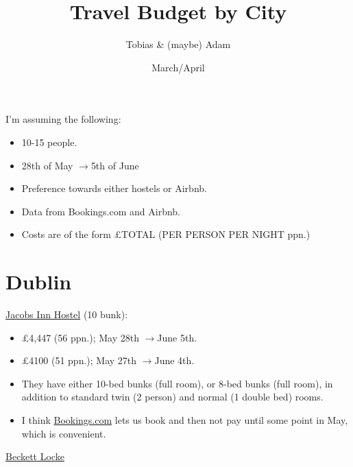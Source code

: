\documentclass[12pt]{article}
\title{Travel Budget by City}
\author{Tobias \& (maybe) Adam}
\date{March/April}
\renewcommand{\to}{$\rightarrow$}
\newcommand{\cost}[2]{\pounds#1 (#2 ppn.)}
\begin{document}
	\maketitle
	I'm assuming the following:
	\begin{itemize}
		\item 10-15 people.
		\item 28th of May \to 5th of June
		\item Preference towards either hostels or Airbnb.
		\item Data from Bookings.com and Airbnb.
		\item Costs are of the form \cost{TOTAL}{PER PERSON PER NIGHT }
	\end{itemize}
	
	\section{Dublin}
	\href{https://www.booking.com/hotel/ie/jacobs-inn.html?aid=355028;sid=3f62ec944d118827daff72c411262409;all_sr_blocks=4030233_332718678_0_2_0;checkin=2022-05-28;checkout=2022-06-05;dest_id=-1502554;dest_type=city;dist=0;group_adults=10;group_children=0;hapos=1;highlighted_blocks=4030233_332718678_0_2_0;hpos=1;matching_block_id=4030233_332718678_0_2_0;no_rooms=1;req_adults=10;req_children=0;room1=A%2CA%2CA%2CA%2CA%2CA%2CA%2CA%2CA%2CA;sb_price_type=total;sr_order=popularity;sr_pri_blocks=4030233_332718678_0_2_0__534084;srepoch=1648311350;srpvid=d240725a64b00365;type=total;ucfs=1&#room_4030233}{Jacobs Inn Hostel} (10 bunk): 
	\begin{itemize}
		\item \cost{4,447}{56}; May 28th \to June 5th.
		\item \cost{4100}{51}; May 27th \to June 4th.
		\item They have either 10-bed bunks (full room), or 8-bed bunks (full room), in addition to standard twin (2 person) and normal (1 double bed) rooms. 
		\item I think \href{https://www.booking.com/}{Bookings.com} lets us book and then not pay until some point in May, which is convenient.
	\end{itemize}
	\href{https://www.booking.com/hotel/ie/beckett-locke.html?sid=3f62ec944d118827daff72c411262409&aid=355028&ucfs=1&arphpl=1&checkin=2022-05-28&checkout=2022-06-05&dest_id=-1502554&dest_type=city&group_adults=10&req_adults=10&no_rooms=1&group_children=0&req_children=0&hpos=2&hapos=2&sr_order=popularity&srpvid=4f9e74ca2749018e&srepoch=1648312598&all_sr_blocks=736390305_335892465_0_0_0%2C736390305_335892465_0_0_0%2C736390302_335892465_0_0_0&highlighted_blocks=736390305_335892465_0_0_0%2C736390305_335892465_0_0_0%2C736390302_335892465_0_0_0&matching_block_id=736390305_335892465_0_0_0&sr_pri_blocks=736390305_335892465_0_0_0__306000%2C736390305_335892465_0_0_0__306000%2C736390302_335892465_0_0_0__204000&from=searchresults#hotelTmpl}{Beckett Locke}
\end{document}
